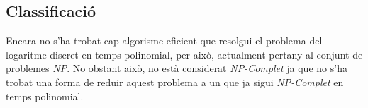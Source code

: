 \documentclass{article}
\begin{document}
\subsection{Classificació}

Encara no s'ha trobat cap algorisme eficient que resolgui el problema del logaritme discret en temps polinomial, per això, actualment pertany al conjunt de problemes \textit{NP}. No obstant això, no està considerat \textit{NP-Complet} ja que no s'ha trobat una forma de reduir aquest problema a un que ja sigui \textit{NP-Complet} en temps polinomial.
\end{document}
